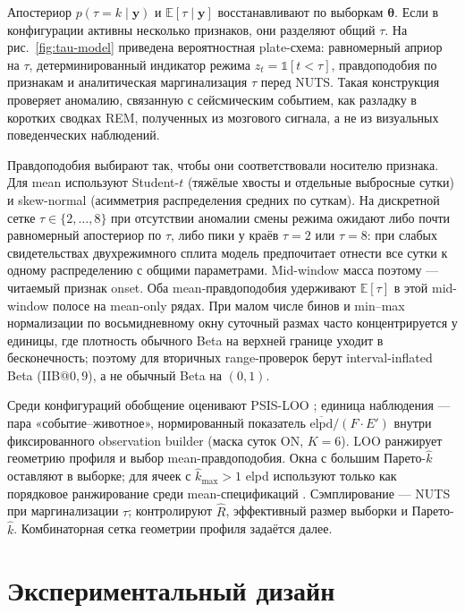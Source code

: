 Апостериор \(p(\tau{=}k\mid\mathbf{y})\) и \(\mathbb{E}[\tau\mid\mathbf{y}]\) восстанавливают по выборкам \(\boldsymbol{\theta}\). Если в конфигурации активны несколько признаков, они разделяют общий \(\tau\). На рис.~\ref{fig:tau-model} приведена вероятностная plate-схема: равномерный априор на \(\tau\), детерминированный индикатор режима \(z_t=\mathbb{1}[t<\tau]\), правдоподобия по признакам и аналитическая маргинализация \(\tau\) перед NUTS. Такая конструкция проверяет аномалию, связанную с сейсмическим событием, как разладку в коротких сводках REM, полученных из мозгового сигнала, а не из визуальных поведенческих наблюдений.

Правдоподобия выбирают так, чтобы они соответствовали носителю признака. Для mean используют Student-\(t\) (тяжёлые хвосты и отдельные выбросные сутки) и skew-normal (асимметрия распределения средних по суткам). На дискретной сетке \(\tau\in\{2,\ldots,8\}\) при отсутствии аномалии смены режима ожидают либо почти равномерный апостериор по \(\tau\), либо пики у краёв \(\tau=2\) или \(\tau=8\): при слабых свидетельствах двухрежимного сплита модель предпочитает отнести все сутки к одному распределению с общими параметрами. Mid-window масса поэтому — читаемый признак onset. Оба mean-правдоподобия удерживают \(\mathbb{E}[\tau]\) в этой mid-window полосе на mean-only рядах. При малом числе бинов и min–max нормализации по восьмидневному окну суточный размах часто концентрируется у единицы, где плотность обычного Beta на верхней границе уходит в бесконечность; поэтому для вторичных range-проверок берут interval-inflated Beta (IIB@\(0{,}9\)), а не обычный Beta на \((0,1)\).

Среди конфигураций обобщение оценивают PSIS-LOO \cite{Vehtari2017,Vehtari2024}; единица наблюдения — пара «событие–животное», нормированный показатель \(\overline{\mathrm{elpd}}/(F\cdot E')\) внутри фиксированного observation builder (маска суток ON, \(K=6\)). LOO ранжирует геометрию профиля и выбор mean-правдоподобия. Окна с большим Парето-\(\hat k\) оставляют в выборке; для ячеек с \(\hat k_{\max}>1\) elpd используют только как порядковое ранжирование среди mean-спецификаций \cite{Vehtari2024}. Сэмплирование — NUTS при маргинализации \(\tau\); контролируют \(\hat R\), эффективный размер выборки и Парето-\(\hat k\). Комбинаторная сетка геометрии профиля задаётся далее.

\section{Экспериментальный дизайн}

